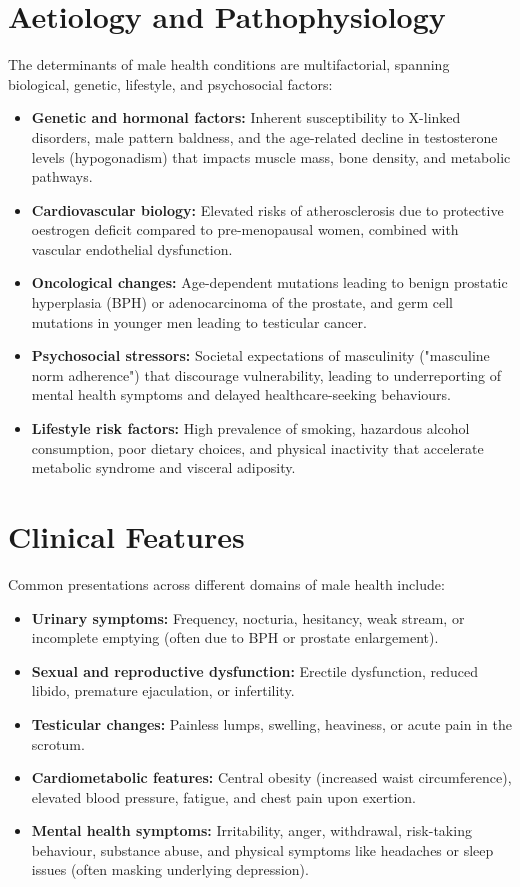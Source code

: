 \section*{Aetiology and Pathophysiology}
The determinants of male health conditions are multifactorial, spanning biological, genetic, lifestyle, and psychosocial factors:
\begin{itemize}
    \item \textbf{Genetic and hormonal factors:} Inherent susceptibility to X-linked disorders, male pattern baldness, and the age-related decline in testosterone levels (hypogonadism) that impacts muscle mass, bone density, and metabolic pathways.
    \item \textbf{Cardiovascular biology:} Elevated risks of atherosclerosis due to protective oestrogen deficit compared to pre-menopausal women, combined with vascular endothelial dysfunction.
    \item \textbf{Oncological changes:} Age-dependent mutations leading to benign prostatic hyperplasia (BPH) or adenocarcinoma of the prostate, and germ cell mutations in younger men leading to testicular cancer.
    \item \textbf{Psychosocial stressors:} Societal expectations of masculinity ("masculine norm adherence") that discourage vulnerability, leading to underreporting of mental health symptoms and delayed healthcare-seeking behaviours.
    \item \textbf{Lifestyle risk factors:} High prevalence of smoking, hazardous alcohol consumption, poor dietary choices, and physical inactivity that accelerate metabolic syndrome and visceral adiposity.
\end{itemize}

\section*{Clinical Features}
Common presentations across different domains of male health include:
\begin{itemize}
    \item \textbf{Urinary symptoms:} Frequency, nocturia, hesitancy, weak stream, or incomplete emptying (often due to BPH or prostate enlargement).
    \item \textbf{Sexual and reproductive dysfunction:} Erectile dysfunction, reduced libido, premature ejaculation, or infertility.
    \item \textbf{Testicular changes:} Painless lumps, swelling, heaviness, or acute pain in the scrotum.
    \item \textbf{Cardiometabolic features:} Central obesity (increased waist circumference), elevated blood pressure, fatigue, and chest pain upon exertion.
    \item \textbf{Mental health symptoms:} Irritability, anger, withdrawal, risk-taking behaviour, substance abuse, and physical symptoms like headaches or sleep issues (often masking underlying depression).
\end{itemize}

